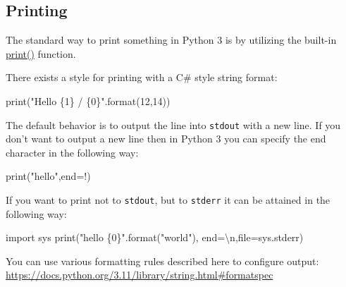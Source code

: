 \documentclass[
]{article}
\newenvironment{Shaded}{}{}
\newcommand{\BuiltInTok}[1]{#1}
\newcommand{\CharTok}[1]{\textcolor[rgb]{0.25,0.44,0.63}{#1}}
\newcommand{\DecValTok}[1]{\textcolor[rgb]{0.25,0.63,0.44}{#1}}
\newcommand{\ImportTok}[1]{#1}
\newcommand{\NormalTok}[1]{#1}
\newcommand{\OperatorTok}[1]{\textcolor[rgb]{0.40,0.40,0.40}{#1}}
\newcommand{\SpecialCharTok}[1]{\textcolor[rgb]{0.25,0.44,0.63}{#1}}
\newcommand{\StringTok}[1]{\textcolor[rgb]{0.25,0.44,0.63}{#1}}
\begin{document}
\hypertarget{printing}{%
\subsection{Printing}\label{printing}}

The standard way to print something in Python 3 is by utilizing the
built-in
\href{https://docs.python.org/3/library/functions.html\#print}{print()}
function.

There exists a style for printing with a C\# style string format:

\begin{Shaded}
\begin{Highlighting}[]
\BuiltInTok{print}\NormalTok{(}\StringTok{"Hello }\SpecialCharTok{\{1\}}\StringTok{ / }\SpecialCharTok{\{0\}}\StringTok{"}\NormalTok{.}\BuiltInTok{format}\NormalTok{(}\DecValTok{12}\NormalTok{,}\DecValTok{14}\NormalTok{))}
\end{Highlighting}
\end{Shaded}

The default behavior is to output the line into \texttt{stdout} with a
new line. If you don't want to output a new line then in Python 3 you
can specify the end character in the following way:

\begin{Shaded}
\begin{Highlighting}[]
\BuiltInTok{print}\NormalTok{(}\StringTok{"hello"}\NormalTok{,end}\OperatorTok{=}\StringTok{\textquotesingle{}!\textquotesingle{}}\NormalTok{)}
\end{Highlighting}
\end{Shaded}

If you want to print not to \texttt{stdout}, but to \texttt{stderr} it
can be attained in the following way:

\begin{Shaded}
\begin{Highlighting}[]
\ImportTok{import}\NormalTok{ sys}
\BuiltInTok{print}\NormalTok{(}\StringTok{"hello }\SpecialCharTok{\{0\}}\StringTok{"}\NormalTok{.}\BuiltInTok{format}\NormalTok{(}\StringTok{"world"}\NormalTok{), end}\OperatorTok{=}\StringTok{\textquotesingle{}}\CharTok{\textbackslash{}n}\StringTok{\textquotesingle{}}\NormalTok{,}\BuiltInTok{file}\OperatorTok{=}\NormalTok{sys.stderr)}
\end{Highlighting}
\end{Shaded}

You can use various formatting rules described here to configure
output:\\
\url{https://docs.python.org/3.11/library/string.html\#formatspec}
\end{document}
